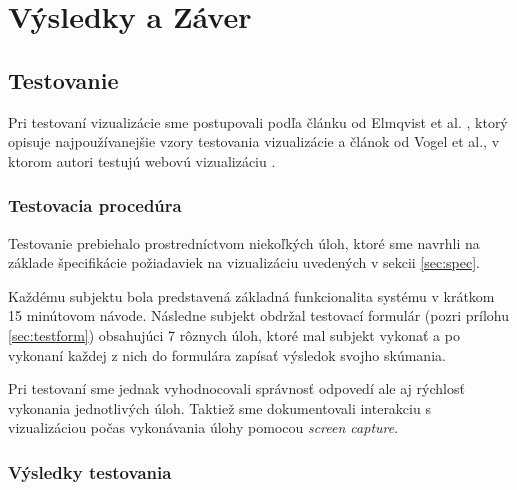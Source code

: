 \chapter{Výsledky a Záver}

\section{Testovanie}
Pri testovaní vizualizácie sme postupovali podľa článku od Elmqvist et al. \cite{Patterns}, ktorý opisuje najpoužívanejšie vzory testovania vizualizácie a článok od Vogel et al., v ktorom autori testujú webovú vizualizáciu \cite{WebBasedUserTest}.

\subsection{Testovacia procedúra}
Testovanie prebiehalo prostredníctvom niekoľkých úloh, ktoré sme navrhli na základe špecifikácie požiadaviek na vizualizáciu uvedených v sekcii \ref{sec:spec}. 

Každému subjektu bola predstavená základná funkcionalita systému v krátkom 15 minútovom návode. Následne subjekt obdržal testovací formulár (pozri prílohu \ref{sec:testform}) obsahujúci 7 rôznych úloh, ktoré mal subjekt vykonať a po vykonaní každej z nich do formulára zapísať výsledok svojho skúmania.

Pri testovaní sme jednak vyhodnocovali správnosť odpovedí ale aj rýchlosť vykonania jednotlivých úloh. Taktiež sme dokumentovali interakciu s vizualizáciou počas vykonávania úlohy pomocou \textit{screen capture}.

\subsection{Výsledky testovania}

